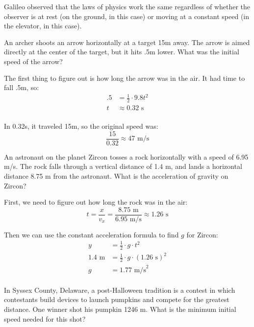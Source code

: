 \documentclass{exam}
\begin{document}
\begin{questions}
\begin{solution}
Galileo observed that the laws of physics work the same regardless of whether the observer is at rest (on the ground, in
this case) or moving at a constant speed (in the elevator, in this case).

\end{solution}

\question
An archer shoots an arrow horizontally at a target 15m away.  The arrow is aimed directly at the center of the target,
but it hits .5m lower.  What was the initial speed of the arrow?

\begin{solution}
The first thing to figure out is how long the arrow was in the air.  It had time to fall .5m, so:
\begin{align*}
  .5 &= \frac{1}{2} \cdot 9.8 t^2 \\
  t &\approx 0.32 \text{ s} \\
\end{align*}

In 0.32s, it traveled 15m, so the original speed was:
\[
  \frac{15}{0.32} \approx 47 \text{ m/s}
\]

\end{solution}

\question
An astronaut on the planet Zircon tosses a rock horizontally with a speed of 6.95 m/s.  The rock falls through a vertical
distance of 1.4 m, and lands a horizontal distance 8.75 m from the astronaut.  What is the acceleration of gravity on
Zircon?

\begin{solution}

First, we need to figure out how long the rock was in the air:
\[
  t = \frac{x}{v_x} = \frac{8.75 \text{ m}}{6.95 \text{ m/s}} \approx 1.26 \text{ s}
\]

Then we can use the constant acceleration formula to find $g$ for Zircon:
\begin{align*}
  y &= \frac{1}{2} \cdot g \cdot t^2 \\
  1.4 \text{ m} &= \frac{1}{2} \cdot g \cdot (1.26 \text{ s})^2 \\
  g &= 1.77 \text{ m/s}^2 \\
\end{align*}

\end{solution}

\question
In Syssex County, Delaware, a post-Halloween tradition is a contest in which contestants build devices to launch
pumpkins and compete for the greatest distance.  One winner shot his pumpkin 1246 m.  What is the minimum initial speed
needed for this shot?


\end{questions}
\end{document}
